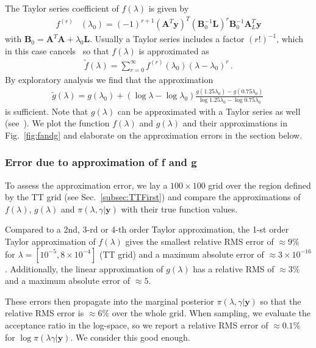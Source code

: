 The Taylor series coefficient of $f(\lambda)$ is given by
\begin{align}
	f^{(r)}& (\lambda_0)= (-1)^{r+1} (\bm{A}^T \bm{y})^T (\bm{B}_0^{-1} \bm{L})^r \bm{B}_0^{-1} \bm{A}_L^T \bm{y} \label{eq:ftay} 
\end{align} 
with $\bm{B}_0 = \bm{A}^T  \bm{A} + \lambda_0 \bm{L}$.
Usually a Taylor series includes a factor $(r!)^{-1}$, which in this case cancels~\cite{fox2016fast} so that $f(\lambda)$ is approximated as 
\begin{align}
		\tilde{f} ( \lambda) = \sum^{\infty}_{r=0} 	f^{(r)}(\lambda_0) (\lambda-\lambda_0)^r  \label{eq:fAprox} \, . 
\end{align}
By exploratory analysis we find that the approximation
\begin{align}
 \tilde{g}(\lambda)=  g(\lambda_{0}) + (\log{\lambda} - \log{\lambda_{0}})  \frac{ g(1.25\lambda_{0}) - g(0.75\lambda_{0}) }{\log{1.25\lambda_{0}} - \log{0.75\lambda_{0}} }  \label{eq:gAprox} \, 
\end{align}
is sufficient.
Note that $g(\lambda)$ can be approximated with a Taylor series as well (see~\cite{fox2016fast}).
We plot the function $f(\lambda)$ and $g(\lambda)$ and their approximations in Fig.~\ref{fig:fandg} and elaborate on the approximation errors in the section below.

\subsubsection{Error due to approximation of f and g}
To assess the approximation error, we lay a $100 \times 100$ grid over the region defined by the TT grid (see Sec.~\ref{subsec:TTFirst}) and compare the approximations of $f(\lambda)$, $g(\lambda)$ and $\pi(\lambda, \gamma | \bm{y})$ with their true function values.

Compared to a 2nd, 3-rd or 4-th order Taylor approximation, the 1-st order Taylor approximation of $f(\lambda)$ gives the smallest relative RMS error of $\approx 9 \%$ for $\lambda = [ 10^{-5}, 8 \times 10^{-4}]$ (TT grid) and a maximum absolute error of $\approx 3 \times 10^{-16}$.
Additionally, the linear approximation of $g(\lambda)$ has a relative RMS of $\approx 3\%$ and a maximum absolute error of $\approx 5$.

These errors then propagate into the marginal posterior $\pi(\lambda , \gamma| \bm{y})$ so that the relative RMS error is $\approx 6 \%$ over the whole grid.
When sampling, we evaluate the acceptance ratio in the log-space, so we report a relative RMS error of $ \approx0.1\%$ for $\log{\pi(\lambda\gamma | \bm{y})}$.
We consider this good enough.




